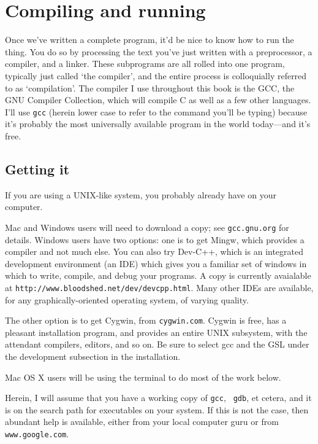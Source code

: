 \documentclass[12pt]{article}
\makeatletter
\def\ttind#1{\index{#1@{\tt #1}}{\tt #1}}
\makeatother
\begin{document}
\section{Compiling and running}

Once we've written a complete program, it'd be nice to know how to run the
thing. You do so by processing the text you've just written with a
preprocessor, a compiler, and a linker. These subprograms are all rolled
into one program, typically just called `the compiler', and the entire
process is colloquially referred to as `compilation'. The compiler I use
throughout this book is the GCC, the GNU Compiler Collection, which will
compile C as well as a few other languages. I'll use {\tt gcc} (herein
lower case to refer to the command you'll be typing) because it's probably
the most universally available program in the world today---and it's free.


\subsection{Getting it} If you are using a UNIX-like system, you probably already have \ttind{gcc} on your
computer.

Mac and Windows users will need to download a copy; see {\tt gcc.gnu.org}
for details. Windows users have two options: one is to get Mingw,
which provides a compiler and not much else. You can also try Dev-C++, which is an integrated development
environment (an IDE) which gives you a familiar set of windows in which to write, compile, and debug your
programs. A copy is currently avaialable at {\tt http://www.bloodshed.net/dev/devcpp.html}.
Many other IDEs are available, for any graphically-oriented operating system, of varying quality.

The other option is to get Cygwin, from {\tt cygwin.com}. Cygwin is
free, has a pleasant installation program, and provides an entire
UNIX subsystem, with the attendant compilers, editors, and so on. Be
sure to select gcc and the GSL under the development subsection in the
installation.

Mac OS X users will be using the terminal to do most of the work below.

Herein, I will assume that you have a working copy of {\tt gcc}, {\tt
gdb}, et cetera, and it is on the search path for executables on your
system. If this is not the case, then abundant help is available, either
from your local computer guru or from {\tt www.google.com}.
\end{document}

